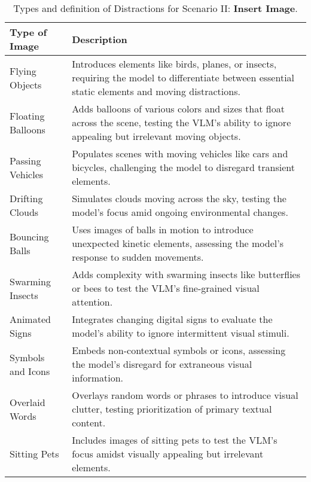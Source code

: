 \begin{table*}[h]
\centering
\begin{tabular}{p{3cm}p{9cm}}
\toprule
\textbf{Type of Image} & \textbf{Description} \\
\midrule
Flying Objects & Introduces elements like birds, planes, or insects, requiring the model to differentiate between essential static elements and moving distractions. \\
\midrule
Floating Balloons & Adds balloons of various colors and sizes that float across the scene, testing the VLM's ability to ignore appealing but irrelevant moving objects. \\
\midrule
Passing Vehicles & Populates scenes with moving vehicles like cars and bicycles, challenging the model to disregard transient elements. \\
\midrule
Drifting Clouds & Simulates clouds moving across the sky, testing the model's focus amid ongoing environmental changes. \\
\midrule
Bouncing Balls & Uses images of balls in motion to introduce unexpected kinetic elements, assessing the model's response to sudden movements. \\
\midrule
Swarming Insects & Adds complexity with swarming insects like butterflies or bees to test the VLM's fine-grained visual attention. \\
\midrule
Animated Signs & Integrates changing digital signs to evaluate the model's ability to ignore intermittent visual stimuli. \\
\midrule
Symbols and Icons & Embeds non-contextual symbols or icons, assessing the model's disregard for extraneous visual information. \\
\midrule
Overlaid Words & Overlays random words or phrases to introduce visual clutter, testing prioritization of primary textual content. \\
\midrule
Sitting Pets & Includes images of sitting pets to test the VLM's focus amidst visually appealing but irrelevant elements. \\
\bottomrule
\end{tabular}
\caption{Types and definition of Distractions for Scenario II: \textbf{Insert Image}.}
\label{tab:defintition insert image}
\end{table*}



